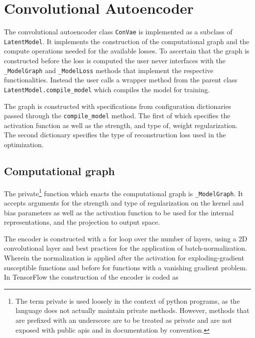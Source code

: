 
\section{Convolutional Autoencoder}\label{sec:convae_implement}

The convolutional autoencoder class \lstinline{ConVae} is implemented as a subclass of \lstinline{LatentModel}. It implements the construction of the computational graph and the compute operations needed for the available losses. To ascertain that the graph is constructed before the loss is computed the user never interfaces with the \lstinline{_ModelGraph} and \lstinline{_ModelLoss} methods that implement the respective functionalities. Instead the user calls a wrapper method from the parent class \lstinline{LatentModel.compile_model} which compiles the model for training.

The graph is constructed with specifications from configuration dictionaries passed through the \lstinline{compile_model} method. The first of which specifies the activation function as well as the strength, and type of, weight regularization. The second dictionary specifies the type of reconstruction loss used in the optimization.

\subsection{Computational graph}

The private\footnote{The term private is used loosely in the context of python programs, as the language does not actually maintain private methods. However, methods that are prefixed with an underscore are to be treated as private and are not exposed with public apis and in documentation by convention.} function which enacts the computational graph is \lstinline{_ModelGraph}. It accepts arguments for the strength and type of regularization on the kernel and bias parameters as well as the activation function to be used for the internal representations, and the projection to output space. 

The encoder is constructed with a for loop over the number of layers, using a 2D convolutional layer and best practices for the application of batch-normalization. Wherein the normalization is applied after the activation for exploding-gradient susceptible functions and before for functions with a vanishing gradient problem. In TensorFlow the construction of the encoder is coded as 

